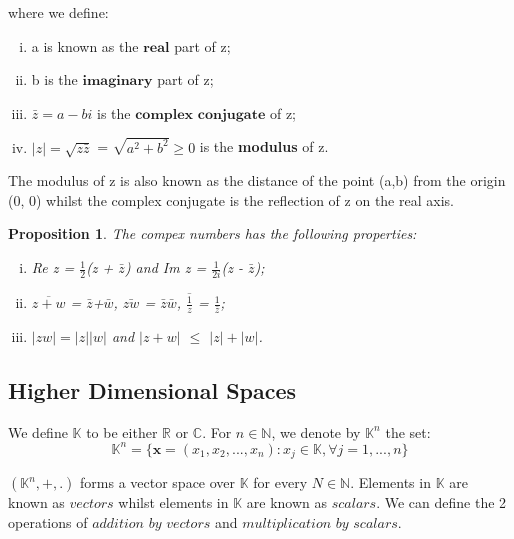 \documentclass[twoside]{article}
\newtheorem{proposition}[theorem]{Proposition}
\begin{document}
where we define:

\begin{enumerate}[(i)]
  \item a is known as the $\textbf{real}$ part of z;
  \item b is the $\textbf{imaginary}$ part of z;
  \item $\bar{z} = a - bi$ is the $\textbf{complex conjugate}$ of z;
  \item $|z| = \sqrt{z\bar{z}}$ = $\sqrt{a^2 + b^2} \geq 0$ is the \textbf{modulus} of z.
\end{enumerate}

The modulus of z is also known as the distance of the point (a,b) from the origin (0, 0) whilst the complex conjugate is the reflection of z on the real axis.

\begin{proposition}
  The compex numbers has the following properties:
  \begin{enumerate}[(i)]
    \item Re z = $\frac{1}{2}$(z + $\bar{z}$) and Im z = $\frac{1}{2i}$(z - $\bar{z}$);
    \item $\overline{z + w}$ = $\bar{z}$+$\bar{w}$, $\bar{zw}$ = $\bar{z}\bar{w}$, $\overline{\frac{1}{z}}$ = $\frac{1}{\bar{z}}$;
    \item $|zw| = |z||w|$ and $|z + w|$ $\leq$ $|z| + |w|$.
  \end{enumerate}
\end{proposition}

\subsection{Higher Dimensional Spaces}
We define $\mathbb{K}$ to be either $\mathbb{R}$ or $\mathbb{C}$. For $n \in \mathbb{N}$, we denote by $\mathbb{K}^n$ the set:
$$
\mathbb{K}^n = \{\mathbf{x} = (x_1, x_2, ..., x_n): x_j \in \mathbb{K}, \forall j = 1,...,n\}
$$

$(\mathbb{K}^n, +, .)$ forms a vector space over $\mathbb{K}$ for every $N \in \mathbb{N}$. Elements in $\mathbb{K}$ are known as $\textit{vectors}$ whilst elements in $\mathbb{K}$ are known as $\textit{scalars}$. We can define the 2 operations of $\textit{addition by vectors}$ and $\textit{multiplication by scalars}$.
\end{document}
